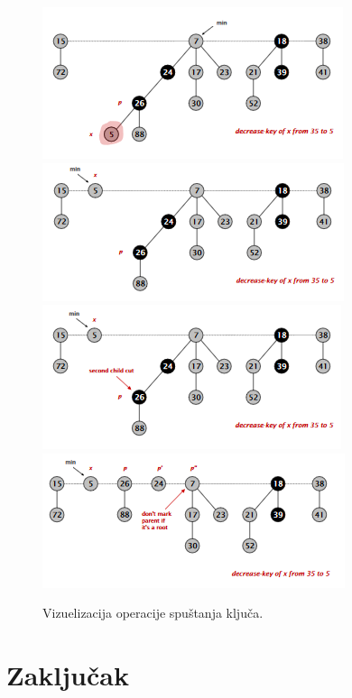\documentclass[a4paper]{article}
\theoremstyle{plain}
\theoremstyle{definition}
\begin{document}
\begin{figure}[H]
    \centering
    \includegraphics[scale=0.6]{resources/fig5a.PNG}
    \includegraphics[scale=0.6]{resources/fig5b.PNG}\\
    \includegraphics[scale=0.6]{resources/fig5c.PNG}
    \includegraphics[scale=0.6]{resources/fig5d.PNG}
    \caption{Vizuelizacija operacije spu\v{s}tanja klju\v{c}a.}
    \label{fig5}
\end{figure}

\section{Zaključak}
\label{sec:Zakljucak}


\appendix



\end{document}

